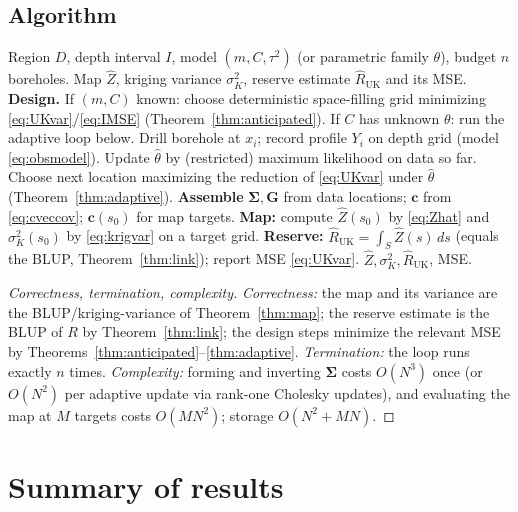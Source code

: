 \documentclass{amsart}
\theoremstyle{definition}
\newcommand{\Rhat}{\widehat R}
\newcommand{\Zhat}{\widehat Z}
\begin{document}
\subsection{Algorithm}

\begin{algorithm}[h]
\caption{Sampling-and-mapping for reserve estimation}
\begin{algorithmic}[1]
\Require Region $D$, depth interval $I$, model $(m,C,\tau^2)$ (or
parametric family $\theta$), budget $n$ boreholes.
\Ensure Map $\Zhat$, kriging variance $\sigma_K^2$, reserve estimate
$\Rhat_{\mathrm{UK}}$ and its MSE.
\State \textbf{Design.} If $(m,C)$ known: choose deterministic
space-filling grid minimizing \eqref{eq:UKvar}/\eqref{eq:IMSE}
(Theorem~\ref{thm:anticipated}). If $C$ has unknown $\theta$: run the
adaptive loop below.
  \State Drill borehole at $x_i$; record profile $Y_i$ on depth grid
  (model \eqref{eq:obsmodel}).
     \State Update $\widehat\theta$ by (restricted) maximum likelihood on
     data so far.
     \State Choose next location maximizing the reduction of
     \eqref{eq:UKvar} under $\widehat\theta$ (Theorem~\ref{thm:adaptive}).
  \EndIf
\EndFor
\State \textbf{Assemble} $\boldsymbol\Sigma,\mathbf G$ from data locations;
$\mathbf c$ from \eqref{eq:cveccov}; $\mathbf c(s_0)$ for map targets.
\State \textbf{Map:} compute $\Zhat(s_0)$ by \eqref{eq:Zhat} and
$\sigma_K^2(s_0)$ by \eqref{eq:krigvar} on a target grid.
\State \textbf{Reserve:} $\Rhat_{\mathrm{UK}}=\int_S\Zhat(s)\,ds$ (equals
the BLUP, Theorem~\ref{thm:link}); report MSE \eqref{eq:UKvar}.
\State \Return $\Zhat,\sigma_K^2,\Rhat_{\mathrm{UK}}$, MSE.
\end{algorithmic}
\end{algorithm}

\begin{proof}[Correctness, termination, complexity]
\emph{Correctness:} the map and its variance are the BLUP/kriging-variance
of Theorem~\ref{thm:map}; the reserve estimate is the BLUP of $R$ by
Theorem~\ref{thm:link}; the design steps minimize the relevant MSE by
Theorems~\ref{thm:anticipated}--\ref{thm:adaptive}. \emph{Termination:} the
loop runs exactly $n$ times. \emph{Complexity:} forming and inverting
$\boldsymbol\Sigma$ costs $O(N^3)$ once (or $O(N^2)$ per adaptive update
via rank-one Cholesky updates), and evaluating the map at $M$ targets costs
$O(MN^2)$; storage $O(N^2+MN)$.
\end{proof}

\section{Summary of results}
\end{document}
